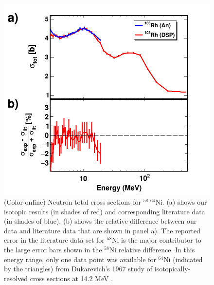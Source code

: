 \documentclass[twocolumn,secnumarabic,amssymb, nobibnotes, aps, prl,
superscriptaddress, nobalancelastpage]{revtex4}
\begin{document}
\begin{figure}
    \includegraphics[scale=0.35]{figures/TwoPanelRh.png}
    \caption{(Color online) Neutron total cross sections for $^{58,64}$Ni.
        (a) shows our isotopic results (in shades of red) and
        corresponding literature data \cite{Perey1993, Dukarevich1967} (in
        shades of blue). (b) shows the relative difference between our data
        and literature data that are shown in panel a). The reported error in
        the literature data set for $^{58}$Ni is the major contributor to the
        large error bars shown in the $^{58}$Ni relative difference. In this
        energy range, only one data point was available for $^{64}$Ni (indicated
        by the triangles) from Dukarevich's 1967 study of isotopically-resolved cross
        sections at 14.2 MeV \cite{Dukarevich1967}.
    }
    \label{TwoPanelRh}
\end{figure}
\end{document}
